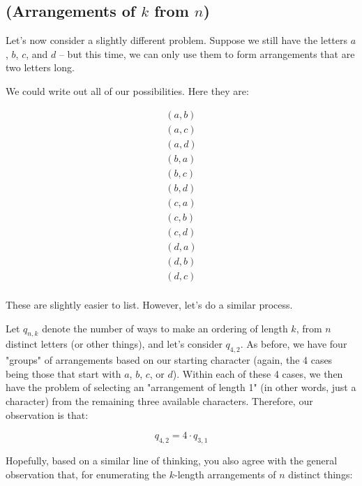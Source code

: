 

\subsection{(Arrangements of $k$ from $n$)}

Let's now consider a slightly different problem. Suppose we still have the letters $a$, $b$, $c$, and $d$ -- but this time, we can only use them to form arrangements that are two letters long.

We could write out all of our possibilities. Here they are:

\begin{gather*}
(a, b) \\
(a, c) \\
(a, d) \\
(b, a) \\
(b, c) \\
(b, d) \\
(c, a) \\
(c, b) \\
(c, d) \\
(d, a) \\
(d, b) \\
(d, c) \\
\end{gather*}

These are slightly easier to list. However, let's do a similar process.

Let $q_{n,k}$ denote the number of ways to make an ordering of length $k$, from $n$ distinct letters (or other things), and let's consider $q_{4,2}$. As before, we have four "groups" of arrangements based on our starting character (again, the 4 cases being those that start with $a$, $b$, $c$, or $d$). Within each of these 4 cases, we then have the problem of selecting an "arrangement of length 1" (in other words, just a character) from the remaining three available characters. Therefore, our observation is that:

\begin{equation*}
q_{4,2} = 4 \cdot q_{3,1}
\end{equation*}

Hopefully, based on a similar line of thinking, you also agree with the general observation that, for enumerating the $k$-length arrangements of $n$ distinct things:


